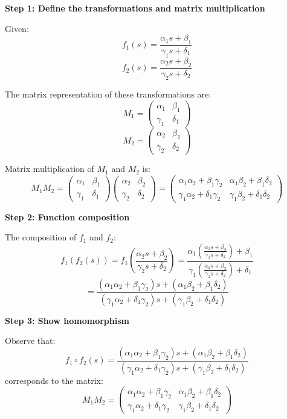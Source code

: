 \documentclass[8pt]{article}
\begin{document}
\textbf{Step 1: Define the transformations and matrix multiplication}

Given:
\[ f_1(s) = \frac{\alpha_1 s + \beta_1}{\gamma_1 s + \delta_1} \]
\[ f_2(s) = \frac{\alpha_2 s + \beta_2}{\gamma_2 s + δ_2} \]

The matrix representation of these transformations are:
\[ M_1 = \begin{pmatrix} \alpha_1 & \beta_1 \\ \gamma_1 & \delta_1 \end{pmatrix} \]
\[ M_2 = \begin{pmatrix} \alpha_2 & \beta_2 \\ \gamma_2 & \delta_2 \end{pmatrix} \]

Matrix multiplication of \( M_1 \) and \( M_2 \) is:
\[ M_1 M_2 = \begin{pmatrix} \alpha_1 & \beta_1 \\ \gamma_1 & \delta_1 \end{pmatrix} \begin{pmatrix} \alpha_2 & \beta_2 \\ \gamma_2 & \delta_2 \end{pmatrix} = \begin{pmatrix} \alpha_1\alpha_2 + \beta_1\gamma_2 & \alpha_1\beta_2 + \beta_1\delta_2 \\ \gamma_1\alpha_2 + \delta_1\gamma_2 & \gamma_1\beta_2 + \delta_1\delta_2 \end{pmatrix} \]

\textbf{Step 2: Function composition}

The composition of \( f_1 \) and \( f_2 \):
\[ f_1(f_2(s)) = f_1\left(\frac{\alpha_2 s + \beta_2}{\gamma_2 s + \delta_2}\right) = \frac{\alpha_1 \left(\frac{\alpha_2 s + \beta_2}{\gamma_2 s + \delta_2}\right) + \beta_1}{\gamma_1 \left(\frac{\alpha_2 s + \beta_2}{\gamma_2 s + \delta_2}\right) + \delta_1} \]
\[ = \frac{(\alpha_1\alpha_2 + \beta_1\gamma_2)s + (\alpha_1\beta_2 + \beta_1\delta_2)}{(\gamma_1\alpha_2 + \delta_1\gamma_2)s + (\gamma_1\beta_2 + \delta_1\delta_2)} \]

\textbf{Step 3: Show homomorphism}

Observe that:
\[ f_1 \circ f_2(s) = \frac{(\alpha_1\alpha_2 + \beta_1\gamma_2)s + (\alpha_1\beta_2 + \beta_1\delta_2)}{(\gamma_1\alpha_2 + \delta_1\gamma_2)s + (\gamma_1\beta_2 + \delta_1\delta_2)} \]
corresponds to the matrix:
\[ M_1 M_2 = \begin{pmatrix} \alpha_1\alpha_2 + \beta_1\gamma_2 & \alpha_1\beta_2 + \beta_1\delta_2 \\ \gamma_1\alpha_2 + \delta_1\gamma_2 & \gamma_1\beta_2 + \delta_1\delta_2 \end{pmatrix} \]
\end{document}

